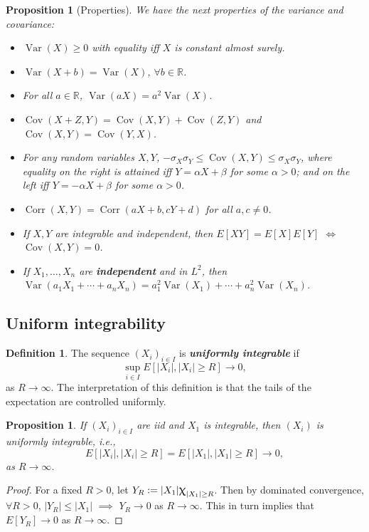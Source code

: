 \documentclass[12pt,reqno]{article}
\renewcommand{\emph}[1]{\textit{#1}}
\theoremstyle{plain}
\newtheorem{prop}[theorem]{Proposition}
\theoremstyle{definition}
\newtheorem{definition}[theorem]{Definition}
\renewcommand{\chi}{\scalebox{1.25}{$\upchi$}}
\begin{document}
\begin{prop}[Properties]
We have the next properties of the variance and covariance: 
\begin{itemize} 

\item[(1)] $\operatorname{Var}(X) \geq 0$ with equality iff 
     $X$ is constant almost surely. 
\item[(2)] $\operatorname{Var}(X+b) = \operatorname{Var}(X)$, 
     $\forall b \in \mathbb{R}$. 
\item[(3)] For all $a \in \mathbb{R}$, 
     $\operatorname{Var}(aX) = a^2 \operatorname{Var}(X)$. 
\item[(4)] $\operatorname{Cov}(X+Z, Y) = \operatorname{Cov}(X, Y) + 
     \operatorname{Cov}(Z, Y)$ and 
     $\operatorname{Cov}(X, Y) = \operatorname{Cov}(Y, X)$. 
\item[(5)] For any random variables $X,Y$, 
     $-\sigma_X\sigma_Y \leq \operatorname{Cov}(X, Y) \leq 
     \sigma_X\sigma_Y$, where equality on the right is attained iff 
     $Y = \alpha X+\beta$ for some $\alpha > 0$; and on the left iff 
     $Y = -\alpha X+\beta$ for some $\alpha > 0$. 
\item[(6)] $\operatorname{Corr}(X, Y) = 
     \operatorname{Corr}(aX+b, cY+d)$ for all $a,c \neq 0$. 
\item[(7)] If $X,Y$ are integrable and independent, then 
     $E[XY] = E[X]E[Y]$ $\iff$ $\operatorname{Cov}(X, Y) = 0$. 
\item[(8)] If $X_1,\ldots,X_n$ are \textbf{independent} and in $L^2$, then 
     $\operatorname{Var}(a_1X_1+\cdots+a_nX_n) = 
     a_1^2 \operatorname{Var}(X_1) + \cdots + 
     a_n^2 \operatorname{Var}(X_n)$. 

\end{itemize} 
\end{prop} 

\subsection{Uniform integrability} 

\begin{definition}
The sequence $(X_i)_{i \in I}$ is \emph{\textbf{uniformly integrable}} if 
\[
\sup_{i \in I} E[|X_i|, |X_i| \geq R] \longrightarrow 0, 
\]
as $R \rightarrow \infty$. The interpretation of this definition is that 
the tails of the expectation are controlled uniformly. 
\end{definition} 

\begin{prop} 
If $(X_i)_{i \in I}$ are iid and $X_1$ is integrable, then $(X_i)$ is 
uniformly integrable, i.e., 
\[
E[|X_i|, |X_i| \geq R] = E[|X_1|, |X_1| \geq R] \longrightarrow 0, 
\]
as $R \rightarrow \infty$. 
\end{prop}
\begin{proof} 
For a fixed $R > 0$, let $Y_R := |X_1| \chi_{|X_1| \geq R}$. Then by 
dominated convergence, $\forall R > 0$, $|Y_R| \leq |X_1|$ $\implies$ 
$Y_R \rightarrow 0$ as $R \rightarrow \infty$. This in turn implies that 
$E[Y_R] \rightarrow 0$ as $R \rightarrow \infty$. 
\end{proof} 
\end{document}
